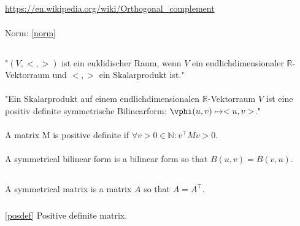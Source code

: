 \documentclass{report}
\begin{document}
\section{}

\url{https://en.wikipedia.org/wiki/Orthogonal_complement}
\\
\\
Norm: \ref{norm}

\section{}

\subsection{}

"$(V,<,>)$ ist ein euklidischer Raum, wenn $V$ ein endlichdimensionaler $\mathbb{R}$-Vektorraum und $<,>$ ein Skalarprodukt ist."
\\
\\
"Ein Skalarprodukt auf einem endlichdimensionalen $\mathbb{R}$-Vektorraum $V$ ist eine positiv definite symmetrische Bilinearform: $\vphi(u,v)\mapsto<u,v>$."
\\
\\
\label{posdef}A matrix M is positive definite if $\forall v>0\in \mathbb{N}: v^\top M v > 0$.
\\
\\
A symmetrical bilinear form is a bilinear form so that $B(u,v)=B(v,u)$.

\subsection{}

\subsection{}

\subsection{}

\section{}

\subsection{}

A symmetrical matrix is a matrix $A$ so that $A=A^\top$.

\subsection{}

\ref{posdef} Positive definite matrix.

\chapter{}

\chapter{}
\end{document}
